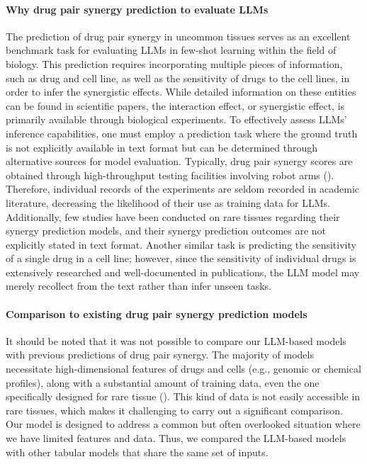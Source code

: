 {\paragraph{Why drug pair synergy prediction to evaluate LLMs}
The prediction of drug pair synergy in uncommon tissues serves as an excellent benchmark task for evaluating LLMs in few-shot learning within the field of biology. This prediction requires incorporating multiple pieces of information, such as drug and cell line, as well as the sensitivity of drugs to the cell lines, in order to infer the synergistic effects. While detailed information on these entities can be found in scientific papers, the interaction effect, or synergistic effect, is primarily available through biological experiments. To effectively assess LLMs' inference capabilities, one must employ a prediction task where the ground truth is not explicitly available in text format but can be determined through alternative sources for model evaluation. Typically, drug pair synergy scores are obtained through high-throughput testing facilities involving robot arms (\cite{he_methods_2018}). Therefore, individual records of the experiments are seldom recorded in academic literature, decreasing the likelihood of their use as training data for LLMs. Additionally, few studies have been conducted on rare tissues regarding their synergy prediction models, and their synergy prediction outcomes are not explicitly stated in text format. Another similar task is predicting the sensitivity of a single drug in a cell line; however, since the sensitivity of individual drugs is extensively researched and well-documented in publications, the LLM model may merely recollect from the text rather than infer unseen tasks.


\paragraph{Comparison to existing drug pair synergy prediction models}
It should be noted that it was not possible to compare our LLM-based models with previous predictions of drug pair synergy. The majority of models necessitate high-dimensional features of drugs and cells (e.g., genomic or chemical profiles), along with a substantial amount of training data, even the one specifically designed for rare tissue (\cite{kim_anticancer_2021}). This kind of data is not easily accessible in rare tissues, which makes it challenging to carry out a significant comparison. Our model is designed to address a common but often overlooked situation where we have limited features and data. Thus, we compared the LLM-based models with other tabular models that share the same set of inputs.


}
